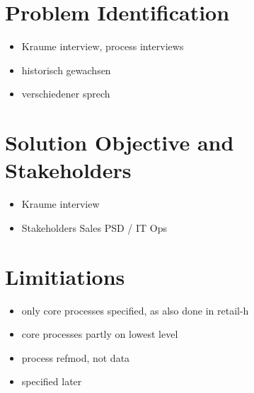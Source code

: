 \section{Problem Identification}
\begin{itemize}
	\item Kraume interview, process interviews
	\item historisch gewachsen
	\item verschiedener sprech
	
\end{itemize}
\section{Solution Objective and Stakeholders}
\begin{itemize}
	\item Kraume interview
	\item Stakeholders
	\subitem Sales
	\subitem PSD / IT
	\subitem Ops
\end{itemize}
\section{Limitiations}
\begin{itemize}
	\item only core processes specified, as also done in retail-h
	\item core processes partly on lowest level
	\item process refmod, not data
	\item specified later
\end{itemize}

